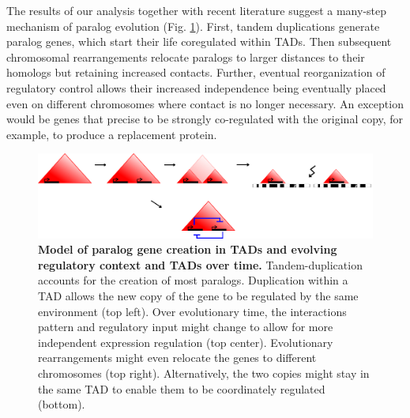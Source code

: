 \documentclass[a4paper,twoside=true,openright,parskip=full,chapterprefix=true,11pt,headings=normal,bibliography=totoc,listof=totoc,titlepage=on,captions=tableabove,draft=false]{scrreprt}
\theoremstyle{definition}
\theoremstyle{definition}
\theoremstyle{definition}
\theoremstyle{remark}
\begin{document}
The results of our analysis together with recent literature suggest a
many-step mechanism of paralog evolution (Fig.
\ref{fig:ParalogSeparation}). First, tandem duplications generate
paralog genes, which start their life coregulated within TADs. Then
subsequent chromosomal rearrangements relocate paralogs to larger
distances to their homologs but retaining increased contacts. Further,
eventual reorganization of regulatory control allows their increased
independence being eventually placed even on different chromosomes where
contact is no longer necessary. An exception would be genes that precise
to be strongly co-regulated with the original copy, for example, to
produce a replacement protein.

\begin{figure}

{\centering \includegraphics[width=0.8\linewidth]{figures/model_paralog_expansion} 

}

\caption{\textbf{Model of paralog gene creation in TADs
and evolving regulatory context and TADs over time.} Tandem-duplication
accounts for the creation of most paralogs. Duplication within a TAD
allows the new copy of the gene to be regulated by the same environment
(top left). Over evolutionary time, the interactions pattern and
regulatory input might change to allow for more independent expression
regulation (top center). Evolutionary rearrangements might even relocate
the genes to different chromosomes (top right). Alternatively, the two
copies might stay in the same TAD to enable them to be coordinately
regulated (bottom).}\label{fig:ParalogSeparation}
\end{figure}
\end{document}
